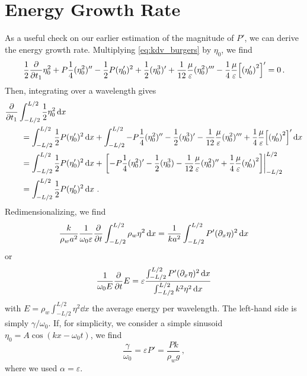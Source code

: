 \documentclass{jfm}
\renewcommand*{\epsilon}{\varepsilon}
\begin{document}
\section{Energy Growth Rate \label{sec:energy_growth_rate}}
As a useful check on our earlier estimation of the magnitude of $P'$, we
can derive the energy growth rate.
Multiplying \cref{eq:kdv_burgers} by $\eta_0$, we find
\begin{equation}
  \frac{1}{2} \pdv{t_1} \eta_0^2 + P
  \frac{1}{4} (\eta_0^2)'' - \frac{1}{2} P
  (\eta_0')^2 + \frac{1}{2} (\eta_0^3)' + \frac{1}{12}
  \frac{\mu}{\epsilon} (\eta_0^2)''' - \frac{1}{4} \frac{\mu}{\epsilon}
  \bqty{\pqty{\eta_0'}^2}' = 0 \,.
\end{equation}
Then, integrating over a wavelength gives
\begin{equation}
  \begin{split}
  &\pdv{t_1} \int_{-L/2}^{L/2} \frac{1}{2} \eta_0^2 \dd{x} \\
  &\qquad= \int_{-L/2}^{L/2} \frac{1}{2} P
    (\eta_0')^2 \dd{x} + \int_{-L/2}^{L/2} -P
    \frac{1}{4} (\eta_0^2)'' - \frac{1}{2}
    (\eta_0^3)' - \frac{1}{12} \frac{\mu}{\epsilon} (\eta_0^2)''' +
    \frac{1}{4} \frac{\mu}{\epsilon} \bqty{\pqty{\eta_0'}^2}' \dd{x}
  \\
  &\qquad=
  \int_{-L/2}^{L/2} \frac{1}{2} P
  (\eta_0')^2 \dd{x} + \eval{\bqty{-P
      \frac{1}{4} (\eta_0^2)'  - \frac{1}{2} (\eta_0^3) - \frac{1}{12}
      \frac{\mu}{\epsilon} (\eta_0^2)'' + \frac{1}{4}
      \frac{\mu}{\epsilon} \pqty{\eta_0'}^2}}_{-L/2}^{L/2}
  \\
  &\qquad=
  \int_{-L/2}^{L/2} \frac{1}{2} P (\eta_0')^2 \dd{x} \,.
  \end{split}
\end{equation}
Redimensionalizing, we find
\begin{equation}
  \frac{k}{\rho_w a^2} \frac{1}{\omega_0 \epsilon} \pdv{t} \int_{-L/2}^{L/2}
  \rho_w \eta^2 \dd{x} = \frac{1}{k a^2} \int_{-L/2}^{L/2} P'
  (\partial_x \eta)^2 \dd{x}
\end{equation}
or
\begin{equation}
  \frac{1}{\omega_0 E} \pdv{t} E =
  \epsilon
  \frac{
    \int_{-L/2}^{L/2} P' (\partial_x \eta)^2 \dd{x}
  }
  {
    \int_{-L/2}^{L/2} k^2 \eta^2 \dd{x}
  }
\end{equation}
with $E = \rho_w \int_{-L/2}^{L/2} \eta^2 \dd{x}$ the average
energy per wavelength.
The left-hand side is simply $\gamma/\omega_0$.
If, for simplicity, we consider a simple sinusoid $\eta_0 = A \cos(k x -
\omega_0 t)$, we find
\begin{equation}
  \frac{\gamma}{\omega_0} = \epsilon P' = \frac{P k}{\rho_w g} \,,
\end{equation}
where we used $\alpha = \epsilon$.



\end{document}
